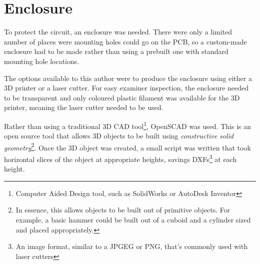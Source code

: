 \section{Enclosure}

To protect the circuit, an enclosure was needed. There were only a limited
number of places were mounting holes could go on the PCB, so a custom-made
enclosure had to be made rather than using a prebuilt one with standard mounting
hole locations.

The options available to this author were to produce the enclosure using either
a 3D printer or a laser cutter. For easy examiner inspection, the enclosure
needed to be transparent and only coloured plastic filament was available for
the 3D printer, meaning the laser cutter needed to be used.

Rather than using a traditional 3D CAD tool\footnote{Computer Aided Design tool,
such as SolidWorks or AutoDesk Inventor}, OpenSCAD was used. This is an open
source tool that allows 3D objects to be built using \textit{constructive solid
geometry}\footnote{In essence, this allows objects to be built out of primitive
  objects. For example, a basic hammer could be built out of a cuboid and a
cylinder sized and placed appropriately.}. Once the 3D object was created, a
small script was written that took horizontal slices of the object at
appropriate heights, savings DXFs\footnote{An image format, similar to a JPGEG
or PNG, that's commonly used with laser cutters} at each height.

